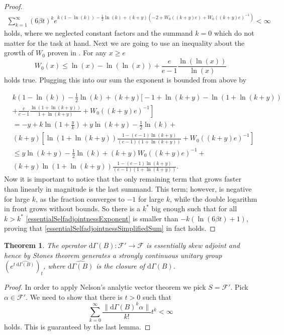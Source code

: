 \documentclass[b5paper,draft,openbib,12pt]{memoir}
\newtheorem{Thm}[Def]{Theorem}
\begin{document}
\begin{proof}
\begin{align}\label{essentialSelfadjointnessSimplifiedSum}
\sum_{k=1}^\infty (6\beta t )^k   e^{k(1-\ln(k))-\frac{1}{2}\ln(k) +(k+y)(-2+W_0((k+y)e) + W_0((k+y)e)^{-1})}<\infty
\end{align}
holds, where we neglected constant factors and the summand \(k=0\) which do not matter for the task at hand. Next we are going
to use an inequality about the growth of \(W_0\) proven in \cite{hoorfar2008inequalities}. For any \(x\ge e\) 
\begin{equation}
W_0(x)\le \ln(x)-\ln( \ln (x)) + \frac{e}{e-1}\frac{\ln (\ln (x))}{\ln (x)}
\end{equation}
holds true. Plugging this into our sum the exponent is bounded from above by

\begin{align}\nonumber
&k(1-\ln(k))-\frac{1}{2}\ln(k) +(k+y)\Big[-1+\ln(k+y) - \ln(1+ \ln (k+y))\\ \nonumber
&\left.+\frac{e}{e-1} \frac{\ln(1+\ln(k+y))}{1+\ln(k+y)} + W_0((k+y)e)^{-1}\right]\\\nonumber
&=-y + k \ln\left(1+\frac{y}{k}\right) + y \ln (k+y) -\frac{1}{2}\ln(k) +\\\nonumber
&(k+y)\left[ \ln (1+\ln(k+y))\frac{1-(e-1)\ln(k+y)}{(e-1)(1+\ln(k+y))} + W_0((k+y)e)^{-1}\right]\\\label{essentialSelfadjointnessExponent}
&\le y \ln (k+y) -\frac{1}{2}\ln(k) + (k+y)W_0((k+y)e)^{-1} +\\\nonumber
&(k+y) \ln (1+\ln(k+y))\frac{1-(e-1)\ln(k+y)}{(e-1)(1+\ln(k+y))} .
\end{align}
Now it is important to notice that the only remaining term that grows 
faster than linearly in magnitude is the last summand.
This term; however, is negative for large \(k\), as the fraction converges 
to \(-1\) for large \(k\), while the double logarithm
in front grows without bounds. So there is a \(k^*\) big enough such that  for all \(k>k^*\) \eqref{essentialSelfadjointnessExponent} 
is smaller than \(- k (\ln(6\beta t) + 1)\), proving that \eqref{essentialSelfadjointnessSimplifiedSum} in fact holds.

\end{proof}



\begin{Thm}\label{Gamma essential selfadjointness}
The operator \(\mathrm{d}\Gamma(B):\mathcal{F}'\rightarrow \mathcal{F}\) is 
essentially skew adjoint and hence by Stones theorem
 generates a strongly continuous unitary group 
 \(\left( e^{t ~\widehat{\mathrm{d}\Gamma(B)}}\right)_t\), where 
 \(\widehat{\mathrm{d}\Gamma(B)}\) is the closure of 
 \(\mathrm{d}\Gamma(B)\).
\end{Thm}
\begin{proof}
In order to apply Nelson's analytic vector theorem we pick \(S=\mathcal{F}'\). 
Pick \(\alpha \in\mathcal{F}'\). We need to show that there is \(t>0\) such 
that
\begin{equation}
\sum_{k=0}^\infty \frac{\|\mathrm{d}\Gamma(B)^k \alpha\|}{k!} t^k <\infty
\end{equation}
holds. This is guaranteed by the last lemma.
\end{proof}
\end{document}
